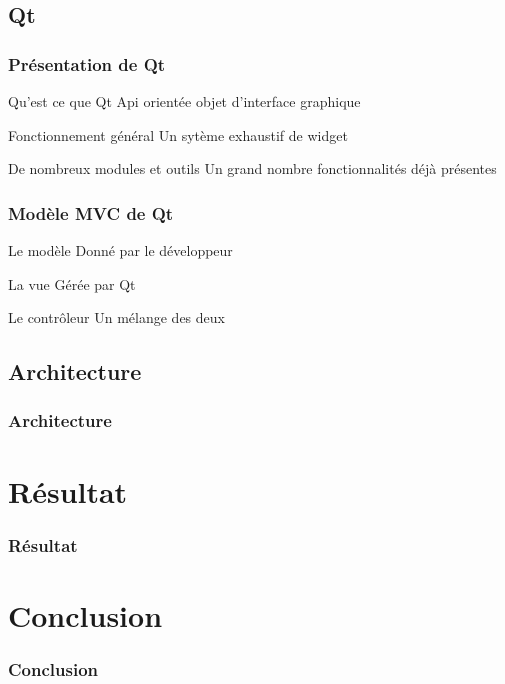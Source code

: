 \documentclass{beamer}
\begin{document}
        \subsection{Qt}
	\begin{frame}
	  \frametitle{Présentation de Qt}
          \begin{block}{Qu'est ce que Qt}
            Api orientée objet d'interface graphique
          \end{block}
          \pause
          \begin{block}{Fonctionnement général}
            Un sytème exhaustif de widget
          \end{block}
          \pause
          \begin{block}{De nombreux modules et outils}
            Un grand nombre fonctionnalités déjà présentes
          \end{block}{}
	\end{frame}

        \begin{frame}
          \frametitle{Modèle MVC de Qt}
          \begin{block}{Le modèle}
            Donné par le développeur
          \end{block}
          \pause
          \begin{block}{La vue}
            Gérée par Qt
          \end{block}
          \pause
          \begin{block}{Le contrôleur}
            Un mélange des deux
          \end{block}
            
            
        \end{frame}

        \subsection{Architecture}
        \begin{frame}
          \frametitle{Architecture}
        \end{frame}



	\section{Résultat}

	\begin{frame}
		\frametitle{Résultat}
	\end{frame}


	\section{Conclusion}

	\begin{frame}
		\frametitle{Conclusion}
	\end{frame}
\end{document}
